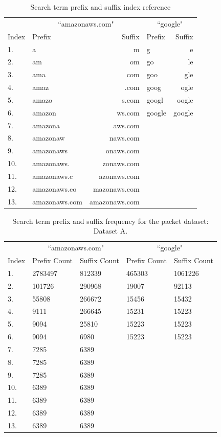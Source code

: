\documentclass{article}
\begin{document}
\begin{table}[h!bt]
  \centering
  \begin{tabular}{l|l|r||l|r}
    & \multicolumn{2}{c}{``amazonaws.com"} & \multicolumn{2}{c}{``google"} \\
    Index & Prefix & Suffix & Prefix & Suffix \\
    \hline
    1. & a  & m  & g  & e \\
    2. & am  & om  & go  & le \\
    3. & ama  & com  & goo  & gle \\
    4. & amaz  & .com  & goog  & ogle \\
    5. & amazo  & s.com  & googl  & oogle \\
    6. & amazon  & ws.com  & google  & google \\
    7. & amazona  & aws.com  &  & \\
    8. & amazonaw  & naws.com  &  & \\
    9. & amazonaws  & onaws.com  &  & \\
    10. & amazonaws.  & zonaws.com  &  & \\
    11. & amazonaws.c  & azonaws.com  &  & \\
    12. & amazonaws.co  & mazonaws.com  &  & \\
    13. & amazonaws.com  & amazonaws.com  &  & 
  \end{tabular}
  \caption{Search term prefix and suffix index reference}
\end{table}

\begin{table}[h!bt]
  \centering
  \begin{tabular}{l|l|l||l|l}
    & \multicolumn{2}{c}{``amazonaws.com"} & \multicolumn{2}{c}{``google"} \\
    Index & Prefix Count & Suffix Count & Prefix Count & Suffix Count \\
    \hline
    1. & 2783497 & 812339 & 465303 & 1061226\\
    2. & 101726 & 290968 & 19007 & 92113\\
    3. & 55808 & 266672 & 15456 & 15432\\
    4. & 9111 & 266645 & 15231 & 15223\\
    5. & 9094 & 25810 & 15223 & 15223\\
    6. & 9094 & 6980 & 15223 & 15223\\
    7. & 7285 & 6389 & &\\
    8. & 7285 & 6389 & &\\
    9. & 7285 & 6389 & &\\
    10. & 6389 & 6389 & &\\
    11. & 6389 & 6389 & &\\
    12. & 6389 & 6389 & &\\
    13. & 6389 & 6389 & &
  \end{tabular}
  \caption{Search term prefix and suffix frequency for the packet dataset: Dataset A.}
  \label{table:packets-prefix-suffix-frequency}
\end{table}
\end{document}
